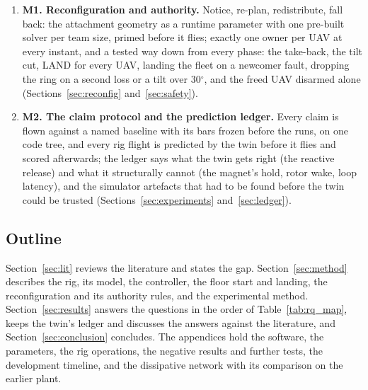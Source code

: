 \begin{enumerate}
    same tick, folds the newcomer in from a small starting tension, and takes it back and lands it if nothing
    is proven. [Twin claim table and its numbers: the joint claim batch of Fri 16 October, then the reviewer.
    Rig: the no-catch flight and the contact attach, 14 October, with repeats on 21--22 October.] (Section~\ref{sec:sim_attach}).
    \item \textbf{M1. Reconfiguration and authority.} Notice, re-plan, redistribute, fall back: the attachment
    geometry as a runtime parameter with one pre-built solver per team size, primed before it flies; exactly
    one owner per UAV at every instant, and a tested way down from every phase: the take-back, the tilt cut,
    LAND for every UAV, landing the fleet on a newcomer fault, dropping the ring on a second loss or a tilt
    over 30$^\circ$, and the freed UAV disarmed alone (Sections~\ref{sec:reconfig} and~\ref{sec:safety}).
    \item \textbf{M2. The claim protocol and the prediction ledger.} Every claim is flown against a named
    baseline with its bars frozen before the runs, on one code tree, and every rig flight is predicted by the
    twin before it flies and scored afterwards; the ledger says what the twin gets right (the reactive release)
    and what it structurally cannot (the magnet's hold, rotor wake, loop latency), and the simulator artefacts
    that had to be found before the twin could be trusted (Sections~\ref{sec:experiments} and~\ref{sec:ledger}).
\end{enumerate}

\subsection{Outline}

Section~\ref{sec:lit} reviews the literature and states the gap. Section~\ref{sec:method} describes the
rig, its model, the controller, the floor start and landing, the reconfiguration and its authority rules,
and the experimental method. Section~\ref{sec:results} answers the questions in the order of
Table~\ref{tab:rq_map}, keeps the twin's ledger and discusses the answers against the literature, and
Section~\ref{sec:conclusion} concludes. The appendices hold the software, the parameters, the rig
operations, the negative results and further tests, the development timeline, and the dissipative network
with its comparison on the earlier plant.
